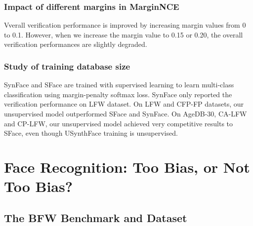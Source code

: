 \documentclass[12pt]{article}
\begin{document}
\subsubsection{Impact of different margins in MarginNCE}
Vverall verification performance
is improved by increasing margin values from 0 to 0.1.
However, when we increase the margin value to 0.15 or 0.20,
the overall verification performances are slightly degraded.
\subsubsection{Study of training database size}
SynFace and SFace are trained with supervised learning to learn
multi-class classification using margin-penalty softmax loss.
SynFace only reported the verification performance on LFW
dataset. On LFW and CFP-FP datasets, our unsupervised
model outperformed SFace and SynFace. On AgeDB-30,
CA-LFW and CP-LFW, our unsupervised model achieved
very competitive results to SFace, even though USynthFace
training is unsupervised.
\section{Face Recognition: Too Bias, or Not Too Bias?}
\subsection{The BFW Benchmark and Dataset}
\end{document}
